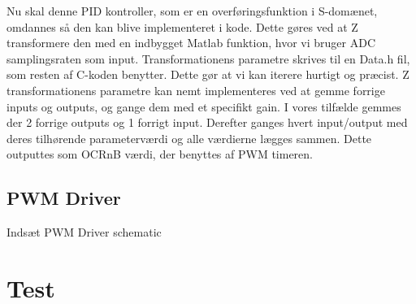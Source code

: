 \documentclass[../main.tex]{subfiles}
\begin{document}
Nu skal denne PID kontroller, som er en overføringsfunktion i S-domænet, omdannes så den kan blive implementeret i kode. Dette gøres ved at Z transformere den med en indbygget Matlab funktion, hvor vi bruger ADC samplingsraten som input. Transformationens parametre skrives til en Data.h fil, som resten af C-koden benytter. Dette gør at vi kan iterere hurtigt og præcist. Z transformationens parametre kan nemt implementeres ved at gemme forrige inputs og outputs, og gange dem med et specifikt gain. I vores tilfælde gemmes der 2 forrige outputs og 1 forrigt input. Derefter ganges hvert input/output med deres tilhørende parameterværdi og alle værdierne lægges sammen. Dette outputtes som OCRnB værdi, der benyttes af PWM timeren.

\subsection{PWM Driver}
Indsæt PWM Driver schematic

\section{Test}


     
\end{document}
